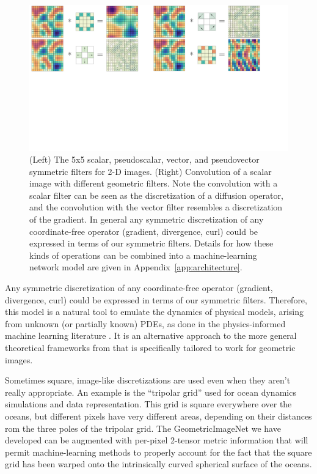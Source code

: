 \documentclass[10pt]{article}
\begin{document}
\begin{figure}[t!]
\begin{mdframed}
    \begin{minipage}{\textwidth}
    \includegraphics[width=\textwidth]{convs.pdf}
    \end{minipage}
    \vspace{-.3cm}
    \caption{(Left) The 5x5 scalar, pseudoscalar, vector, and pseudovector symmetric filters for 2-D images. (Right) Convolution of a scalar image with different geometric filters. Note the convolution with a scalar filter can be seen as the discretization of a diffusion operator, and the convolution with the vector filter resembles a discretization of the gradient. In general any symmetric discretization of any coordinate-free operator (gradient, divergence, curl) could be expressed in terms of our symmetric filters. Details for how these kinds of operations can be combined into a machine-learning network model are given in Appendix~\ref{app:architecture}.}
    \label{fig.GINet}
\end{mdframed}\end{figure}

Any symmetric discretization of any coordinate-free operator (gradient, divergence, curl) could be expressed in terms of our symmetric filters.
Therefore, this model is a natural tool to emulate the dynamics of physical models, arising from unknown (or partially known) PDEs, as done in the physics-informed machine learning literature \cite{karniadakis2021physics, hao2022physics}.
It is an alternative approach to the more general theoretical frameworks from \cite{steerable, jenner2021steerable, bhardwaj2023steerable, clifford} that is specifically tailored to work for geometric images.   

Sometimes square, image-like discretizations are used even when they aren't really appropriate.
An example is the ``tripolar grid'' used for ocean dynamics simulations and data representation.
This grid is square everywhere over the oceans, but different pixels have very different areas, depending on their distances rom the three poles of the tripolar grid.
The GeometricImageNet we have developed can be augmented with per-pixel 2-tensor metric information that will permit machine-learning methods to properly account for the fact that the square grid has been warped onto the intrinsically curved spherical surface of the oceans.
\end{document}
